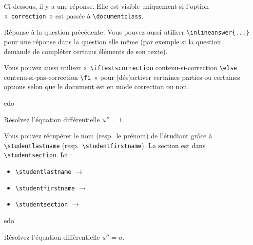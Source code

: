 \documentclass[12pt,a4paper, rulers%
]{tests}
\begin{document}
Ci-dessous, il y a une réponse.  Elle est visible uniquement si
l'option «~\verb+correction+~» est passée à \verb+\documentclass+.
\begin{answer}
  Réponse à la question précédente.  Vous pouvez aussi utiliser
  \verb+\inlineanswer{...}+ pour une réponse dans la question elle
  même (par exemple si la question demande de compléter certains
  éléments de son texte).
\end{answer}

Vous pouvez aussi utiliser «~\verb+\iftestscorrection+
contenu-si-correction \verb+\else+ contenu-si-pas-correction
\verb+\fi+~» pour (dés)activer certaines parties ou certaines options
selon que le document est en mode correction ou non.

\vspace{3ex}

\begin{namequestion}{edo}%
  \begin{question}
    Résolvez l'équation différentielle $u'' = 1$.

    Vous pouvez récupérer le nom (resp.\ le prénom) de l'étudiant
    grâce à \texttt{\textbackslash studentlastname} (resp.\
    \texttt{\textbackslash studentfirstname}).  La section est dans
    \texttt{\textbackslash studentsection}. Ici :
    \begin{itemize}
    \item \texttt{\textbackslash studentlastname} $\to$ \studentlastname
    \item \texttt{\textbackslash studentfirstname} $\to$ \studentfirstname
    \item \texttt{\textbackslash studentsection} $\to$ \studentsection
    \end{itemize}
  \end{question}
\end{namequestion}
\begin{namequestion}{edo}%
  \begin{question}
    Résolvez l'équation différentielle $u'' = u$.
  \end{question}
\end{namequestion}


\exam
{}%
\maketitle %
\end{document}
